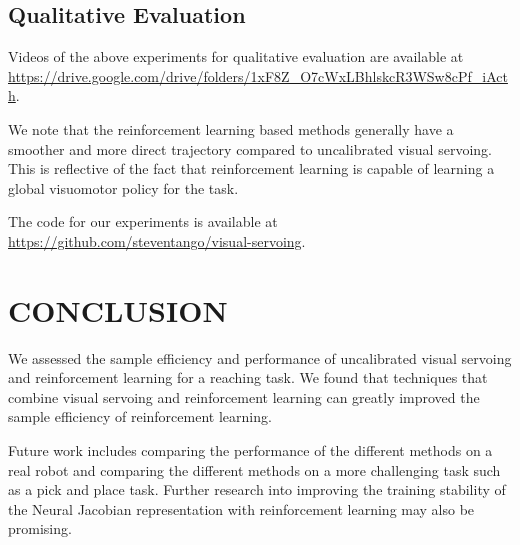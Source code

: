 \documentclass[letterpaper, 10 pt, conference]{ieeeconf}  %
\begin{document}
\subsection{Qualitative Evaluation}

Videos of the above experiments for qualitative evaluation are available at
\url{https://drive.google.com/drive/folders/1xF8Z_O7cWxLBhlskcR3WSw8cPf_iActh}.

We note that the reinforcement learning based methods generally have a smoother
and more direct trajectory compared to uncalibrated visual servoing. This
is reflective of the fact that reinforcement learning is capable of learning a
global visuomotor policy for the task.

The code for our experiments is available at
\url{https://github.com/steventango/visual-servoing}.

\section{CONCLUSION} \label{Conclusion}

We assessed the sample efficiency and performance of uncalibrated visual
servoing and reinforcement learning for a reaching task. We found that
techniques that combine visual servoing and reinforcement learning can greatly
improved the sample efficiency of reinforcement learning.

Future work includes comparing the performance of the different methods on a
real robot and comparing the different methods on a more challenging task such
as a pick and place task. Further research into improving the training stability
of the Neural Jacobian representation with reinforcement learning may also be
promising.


\end{document}
